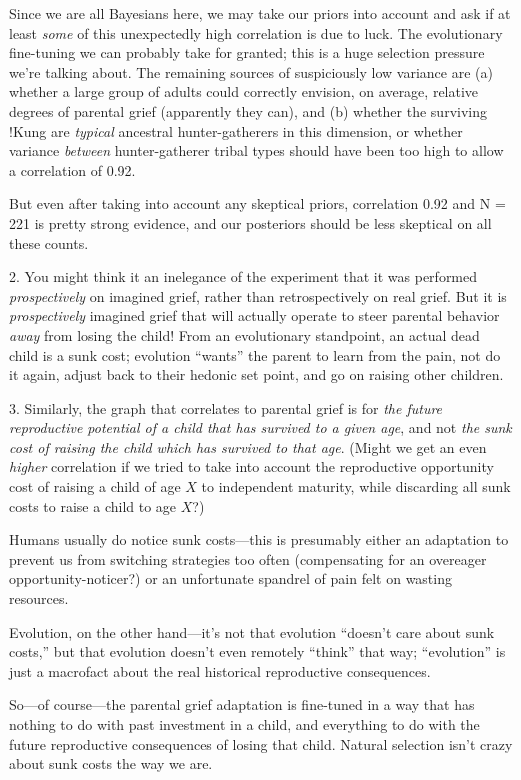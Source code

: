  Since we are all Bayesians here, we may take our priors into
account and ask if at least \textit{some} of this unexpectedly high
correlation is due to luck. The evolutionary fine-tuning we can
probably take for granted; this is a huge selection pressure
we're talking about. The remaining sources of
suspiciously low variance are (a) whether a large group of adults could
correctly envision, on average, relative degrees of parental grief
(apparently they can), and (b) whether the surviving !Kung are
\textit{typical} ancestral hunter-gatherers in this dimension, or
whether variance \textit{between} hunter-gatherer tribal types should
have been too high to allow a correlation of 0.92.


 But even after taking into account any skeptical priors,
correlation 0.92 and N = 221 is pretty strong evidence, and our
posteriors should be less skeptical on all these counts.


 2. You might think it an inelegance of the experiment that it was
performed \textit{prospectively} on imagined grief, rather than
retrospectively on real grief. But it is \textit{prospectively}
imagined grief that will actually operate to steer parental behavior
\textit{away} from losing the child! From an evolutionary standpoint,
an actual dead child is a sunk cost; evolution
``wants'' the parent to learn from
the pain, not do it again, adjust back to their hedonic set point, and
go on raising other children.


 3. Similarly, the graph that correlates to parental grief is for
\textit{the future reproductive potential of a child that has survived
to a given age}, and not \textit{the sunk cost of raising the child
which has survived to that age}. (Might we get an even \textit{higher}
correlation if we tried to take into account the reproductive
opportunity cost of raising a child of age $X$ to independent maturity,
while discarding all sunk costs to raise a child to age $X$?)


 Humans usually do notice sunk costs---this is presumably either an
adaptation to prevent us from switching strategies too often
(compensating for an overeager opportunity-noticer?) or an unfortunate
spandrel of pain felt on wasting resources.


 Evolution, on the other hand---it's not that
evolution ``doesn't care about sunk
costs,'' but that evolution doesn't
even remotely ``think'' that way;
``evolution'' is just a macrofact
about the real historical reproductive consequences.


 So---of course---the parental grief adaptation is fine-tuned in a
way that has nothing to do with past investment in a child, and
everything to do with the future reproductive consequences of losing
that child. Natural selection isn't crazy about sunk
costs the way we are.


